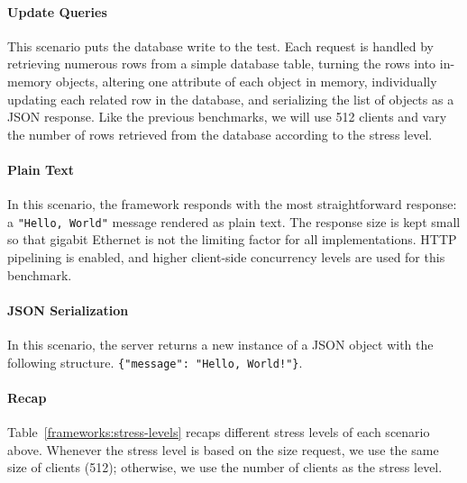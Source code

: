 \paragraph{Update Queries}
This scenario puts the database write to the test.
Each request is handled by retrieving numerous rows from a simple database table, turning the rows into in-memory objects, altering one attribute of each object in memory, individually updating each related row in the database, and serializing the list of objects as a JSON response.
Like the previous benchmarks, we will use 512 clients and vary the number of rows retrieved from the database according to the stress level.

\paragraph{Plain Text}
In this scenario, the framework responds with the most straightforward response: a \texttt{"Hello, World"} message rendered as plain text.
The response size is kept small so that gigabit Ethernet is not the limiting factor for all implementations.
HTTP pipelining is enabled, and higher client-side concurrency levels are used for this benchmark.

\paragraph{JSON Serialization}
In this scenario, the server returns a new instance of a JSON object with the following structure. \texttt{\{"message": "Hello, World!"\}}.

\paragraph{Recap}

Table~\ref{frameworks:stress-levels} recaps different stress levels of each scenario above. Whenever the stress level is based on the size request, we use the same size of clients (512); otherwise, we use the number of clients as the stress level.

